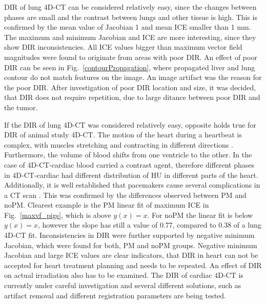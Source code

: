 \documentclass[type=dr, dr=rernat, accentcolor=tud7b,colorbacktitle, bigchapter, openright, twoside, 12pt ]{tudthesis}
\begin{document}
DIR of lung 4D-CT can be considered relatively easy, since the changes between phases are small and the contrast between lungs and other tissue is high. 
This is confirmed by the mean value of Jacobian 1 and mean ICE smaller than 1 mm. The maximum and minimum Jacobian and ICE are more interesting, since they show 
DIR inconsistencies. All ICE values bigger than maximum vector field magnitudes were found to originate from areas with poor DIR. An effect of poor DIR can be seen in Fig.~\ref{contourPropagation},
where propagated liver and lung contour do not match features on the image. An image artifact was the reason for the poor DIR. After investigation of poor DIR location and size, 
it was decided, that DIR does not require repetition, due to large ditance between poor DIR and the tumor.

If the DIR of lung 4D-CT was considered relatively easy, opposite holds true for DIR of animal study 4D-CT. The motion of the heart during a heartbeat is complex, 
with muscles stretching and contracting in different directions \cite{Seeley2007}. Furthermore,
the volume of blood shifts from one ventricle to the other. In the case of 4D-CT-cardiac blood carried a contrast agent, therefore different phases in 4D-CT-cardiac 
had different distribution of HU in different parts of the heart. Additionally, it is well established that pacemakers cause several complications in a CT scan \cite{Mak2012}. This was
confirmed by the differences observed between PM and noPM. Clearest example is the PM linear fit of maximum ICE in Fig.~\ref{maxvf_pigs}, which is above $y(x) = x$. For noPM the linear
fit is below $y(x)=x$, however the slope has still a value of 0.77, compared to 0.38 of a lung 4D-CT fit. Inconsistencies in DIR were further supported by negative minimum Jacobian, which were found for both,
PM and noPM groups. Negative minimum Jacobian and large ICE values are clear indicators, that DIR in heart can not be 
accepted for heart treatment planning and needs to be repeated. An effect of DIR on actual irradiation also has to be examined.
The DIR of cardiac 4D-CT is currently under careful investigation
and several different solutions, such as artifact removal and different registration parameters are being tested.
\end{document}
